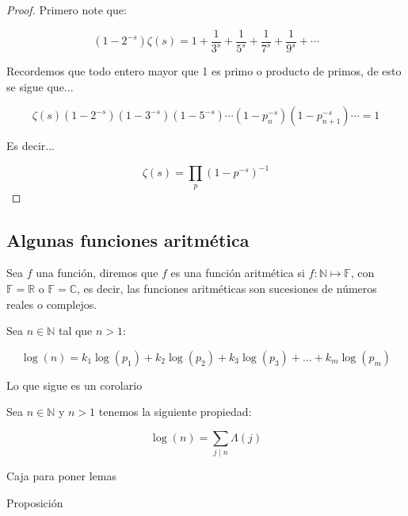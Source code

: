\begin{proof}
    Primero note que:

    $$(1-2^{-s})\zeta(s)=1+\dfrac{1}{3^s}+\dfrac{1}{5^s}+\dfrac{1}{7^s}+\dfrac{1}{9^s}+\cdots$$

    Recordemos que todo entero mayor que 1 es primo o producto de primos, de esto se sigue que...

    $$\zeta(s)\left(1-2^{-s}\right)(1-3^{-s})(1-5^{-s})\cdots(1-p_n^{-s})(1-p_{n+1}^{-s})\cdots=1$$

    Es decir...

    $$\zeta(s)=\prod_p (1-p^{-s})^{-1}$$
\end{proof}

\subsection{Algunas funciones aritmética}

\begin{definition}
    Sea $f$ una función, diremos que $f$ es una función aritmética si $f: \mathbb{N}\mapsto \mathbb{F}$, con $\mathbb{F}=\mathbb{R}$ o $\mathbb{F}=\mathbb{C}$, es decir, las funciones aritméticas son sucesiones de números reales o complejos.
\end{definition}


\begin{theorem}
    Sea $n\in \mathbb{N}$ tal que $n>1$:

    $$\log(n)=k_1\log(p_1)+k_2\log(p_2)+k_3\log(p_3)+\ldots+k_m\log(p_m)$$
\end{theorem}

Lo que sigue es un corolario

\begin{corollary}
    Sea $n\in \mathbb{N}$ y $n>1$ tenemos la siguiente propiedad:

    $$\log(n)=\sum_{j\mid n}\Lambda(j)$$
\end{corollary}

\lipsum[4]

\begin{eg}
    \lipsum[3]
\end{eg}

\lipsum[9]
\begin{lemma}
    Caja para  poner lemas \lipsum[4]
\end{lemma}

\lipsum[1-9]

\begin{prop}
    Proposición \lipsum[6]
\end{prop}